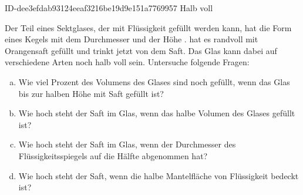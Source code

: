\begin{exercise}
      {ID-dee3efdab93124eeaf3216be19d9e151a7769957}
      {Halb voll}
  \ifproblem\problem\par
    Der Teil eines Sektglases, der mit Flüssigkeit gefüllt werden kann,
    hat die Form eines Kegels mit dem Durchmesser  und der
    Höhe . \xxa{} hat es randvoll mit Orangensaft gefüllt
    und trinkt jetzt von dem Saft. Das Glas kann dabei auf verschiedene
    Arten noch \glqq halb voll\grqq{} sein. Untersuche folgende Fragen:
    \begin{enumerate}[a)]
      \item Wie viel Prozent des Volumens des Glases sind noch gefüllt,
            wenn das Glas bis zur halben Höhe mit Saft gefüllt ist?
      \item Wie hoch steht der Saft im Glas, wenn das halbe Volumen
            des Glases gefüllt ist?
      \item Wie hoch steht der Saft im Glas, wenn der Durchmesser des
            Flüssigkeitsspiegels auf die Hälfte abgenommen hat?
      \item Wie hoch steht der Saft, wenn die halbe Mantelfläche
            von Flüssigkeit bedeckt ist?
    \end{enumerate}
  \fi
\end{exercise}
